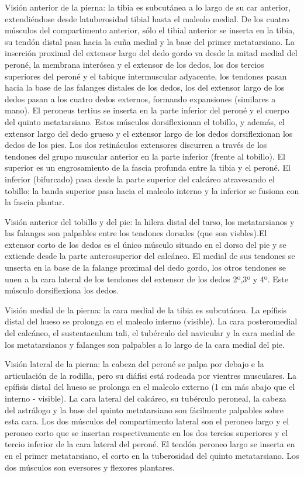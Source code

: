 Visión anterior de la pierna: la tibia es subcutánea a lo largo de su car anterior, extendiéndose desde latuberosidad tibial hasta el maleolo medial. De los cuatro músculos del compartimento anterior, sólo el tibial anterior se inserta en la tibia, su tendón distal pasa hacia la cuña medial y la base del primer metatarsiano. La inserción proximal del extensor largo del dedo gordo va desde la mitad medial del peroné, la membrana interósea y el extensor de los dedos, los dos tercios superiores del peroné y el tabique intermuscular adyacente, los tendones pasan hacia la base de las falanges distales de los dedos, los del extensor largo de los dedos pasan a los cuatro dedos externos, formando expansiones (similares a mano). El peroneus tertius se inserta en la parte inferior del peroné y el cuerpo del quinto metatarsiano. Estos músculos dorsiflexionan el tobillo, y además, el extensor largo del dedo grueso y el extensor largo de los dedos dorsiflexionan los dedos de los pies.
Los dos retináculos extensores discurren a través de los tendones del grupo muscular anterior en la parte inferior (frente al tobillo). El superior es un engrosamiento de la fascia profunda entre la tibia y el peroné. El inferior (bifurcado) pasa desde la parte superior del calcáreo atravesando el tobillo: la banda superior pasa hacia el maleolo interno y la inferior se fusiona con la fascia plantar.

Visión anterior del tobillo y del pie: la hilera distal del tarso, los metatarsianos y las falanges son palpables entre los tendones dorsales (que son visbles).El extensor corto de los dedos es el único músculo situado en el dorso del pie y se extiende desde la parte anterosuperior del calcáneo. El medial de sus tendones se unserta en la base de la falange proximal del dedo gordo, los otros tendones se unen a la cara lateral de los tendones del extensor de los dedos 2º,3º y 4º. Este músculo dorsiflexiona los dedos.

Visión medial de la pierna: la cara medial de la tibia es subcutánea. La epífisis distal del hueso se prolonga en el maleolo interno (visible). La cara posteromedial del calcáneo, el sustentaculum tali, el tubérculo del navicular y la cara medial de los metatarsianos y falanges son palpables a lo largo de la cara medial del pie.

Visión lateral de la pierna: la cabeza del peroné se palpa por debajo e la articulación de la rodilla, pero su diáfisi está rodeada por vientres musculares. La epífisis distal del hueso se prolonga en el maleolo externo (1 cm más abajo que el interno - visible). La cara lateral del calcáreo, su tubérculo peroneal, la cabeza del astrálogo y la base del quinto metatarsiano son fácilmente palpables sobre esta cara. Los dos músculos del compartimento lateral son el peroneo largo y el peroneo corto que se insertan respectivamente en los dos tercios superiores y el tercio inferior de la cara lateral del peroné. El tendón peroneo largo se inserta en en el primer metatarsiano, el corto  en la tuberosidad del quinto metatarsiano. Los dos músculos son eversores y flexores plantares.

